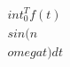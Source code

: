 \documentclass[preview]{standalone}
\begin{document}
\begin{align*}
\quad\\int_0^T f(t) \quad\\sin(n\quad\\omega t) dt
\end{align*}
\end{document}
